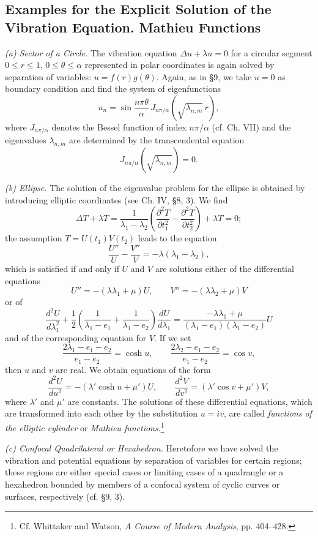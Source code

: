 \subsection{Examples for the Explicit Solution of the Vibration Equation. Mathieu Functions}
\textit{(a) Sector of a Circle.} The vibration equation $\Delta u+\lambda u=0$ for a circular segment $0\le r\le1$, $0\le\theta\le\alpha$ represented in polar coordinates is again solved by separation of variables: $u=f(r)g(\theta)$. Again, as in \S9, we take $u=0$ as boundary condition and find the system of eigenfunctions
\[
u_n=\sin\frac{n\pi\theta}{\alpha}\,
J_{n\pi/\alpha}(\sqrt{\lambda_{n,m}}\,r),
\]
where $J_{n\pi/\alpha}$ denotes the Bessel function of index $n\pi/\alpha$ (cf. Ch. VII) and the eigenvalues $\lambda_{n,m}$ are determined by the transcendental equation
\[
J_{n\pi/\alpha}(\sqrt{\lambda_{n,m}})=0.
\]

\textit{(b) Ellipse.} The solution of the eigenvalue problem for the ellipse is obtained by introducing elliptic coordinates (see Ch. IV, \S8, 3). We find
\[
\Delta T+\lambda T=\frac1{\lambda_1-\lambda_2}
\left(\frac{\partial^2T}{\partial t_1^2}-\frac{\partial^2T}{\partial t_2^2}\right)+\lambda T=0;
\]
the assumption $T=U(t_1)V(t_2)$ leads to the equation
\[
\frac{U''}{U}-\frac{V''}{V}=-\lambda(\lambda_1-\lambda_2),
\]
which is satisfied if and only if $U$ and $V$ are solutions either of the differential equations
\[
U''=-(\lambda\lambda_1+\mu)U,\qquad
V''=-(\lambda\lambda_2+\mu)V
\]
or of
\[
\frac{d^2U}{d\lambda_1^2}
+\frac12\left(\frac1{\lambda_1-e_1}+\frac1{\lambda_1-e_2}\right)\frac{dU}{d\lambda_1}
=\frac{-\lambda\lambda_1+\mu}{(\lambda_1-e_1)(\lambda_1-e_2)}U
\]
and of the corresponding equation for $V$.
If we set
\[
\frac{2\lambda_1-e_1-e_2}{e_1-e_2}=\cosh u,
\qquad
\frac{2\lambda_2-e_1-e_2}{e_1-e_2}=\cos v,
\]
then $u$ and $v$ are real. We obtain equations of the form
\[
\frac{d^2U}{du^2}=-(\lambda'\cosh u+\mu')U,
\qquad
\frac{d^2V}{dv^2}=(\lambda'\cos v+\mu')V,
\]
where $\lambda'$ and $\mu'$ are constants. The solutions of these differential equations, which are transformed into each other by the substitution $u=iv$, are called \emph{functions of the elliptic cylinder} or \emph{Mathieu functions}.\footnote{Cf. Whittaker and Watson, \emph{A Course of Modern Analysis}, pp. 404--428.}

\textit{(c) Confocal Quadrilateral or Hexahedron.} Heretofore we have solved the vibration and potential equations by separation of variables for certain regions; these regions are either special cases or limiting cases of a quadrangle or a hexahedron bounded by members of a confocal system of cyclic curves or surfaces, respectively (cf. \S9, 3).

